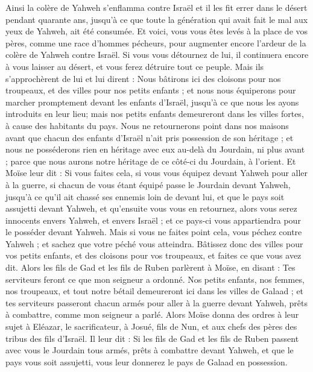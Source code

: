 \begin{multicols}{2}
Ainsi la colère de Yahweh s'enflamma contre Israël et il les fit errer dans le désert pendant quarante ans, jusqu'à ce que toute la génération qui avait fait le mal aux yeux de Yahweh, ait été consumée.
Et voici, vous vous êtes levés à la place de vos pères, comme une race d'hommes pécheurs, pour augmenter encore l'ardeur de la colère de Yahweh contre Israël.
Si vous vous détournez de lui, il continuera encore à vous laisser au désert, et vous ferez détruire tout ce peuple.
Mais ils s'approchèrent de lui et lui dirent : Nous bâtirons ici des cloisons pour nos troupeaux, et des villes pour nos petits enfants ;
et nous nous équiperons pour marcher promptement devant les enfants d'Israël, jusqu'à ce que nous les ayons introduits en leur lieu; mais nos petits enfants demeureront dans les villes fortes, à cause des habitants du pays.
Nous ne retournerons point dans nos maisons avant que chacun des enfants d'Israël n'ait pris possession de son héritage ;
et nous ne posséderons rien en héritage avec eux au-delà du Jourdain, ni plus avant ; parce que nous aurons notre héritage de ce côté-ci du Jourdain, à l'orient.
Et Moïse leur dit : Si vous faites cela, si vous vous équipez devant Yahweh pour aller à la guerre,
si chacun de vous étant équipé passe le Jourdain devant Yahweh, jusqu'à ce qu'il ait chassé ses ennemis loin de devant lui,
et que le pays soit assujetti devant Yahweh, et qu’ensuite vous vous en retournez, alors vous serez innocents envers Yahweh, et envers Israël ; et ce pays-ci vous appartiendra pour le posséder devant Yahweh.
Mais si vous ne faites point cela, vous péchez contre Yahweh ; et sachez que votre péché vous atteindra.
Bâtissez donc des villes pour vos petits enfants, et des cloisons pour vos troupeaux, et faites ce que vous avez dit.
Alors les fils de Gad et les fils de Ruben parlèrent à Moïse, en disant : Tes serviteurs feront ce que mon seigneur a ordonné.
Nos petits enfants, nos femmes, nos troupeaux, et tout notre bétail demeureront ici dans les villes de Galaad ;
et tes serviteurs passeront chacun armés pour aller à la guerre devant Yahweh, prêts à combattre, comme mon seigneur a parlé.
Alors Moïse donna des ordres à leur sujet à Eléazar, le sacrificateur, à Josué, fils de Nun, et aux chefs des pères des tribus des fils d'Israël.
Il leur dit : Si les fils de Gad et les fils de Ruben passent avec vous le Jourdain tous armés, prêts à combattre devant Yahweh, et que le pays vous soit assujetti, vous leur donnerez le pays de Galaad en possession.

\end{multicols}
